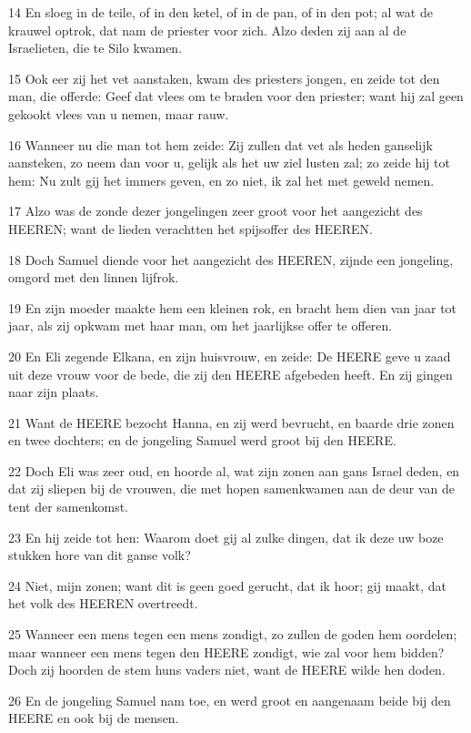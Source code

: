 \par 14 En sloeg in de teile, of in den ketel, of in de pan, of in den pot; al wat de krauwel optrok, dat nam de priester voor zich. Alzo deden zij aan al de Israelieten, die te Silo kwamen.
\par 15 Ook eer zij het vet aanstaken, kwam des priesters jongen, en zeide tot den man, die offerde: Geef dat vlees om te braden voor den priester; want hij zal geen gekookt vlees van u nemen, maar rauw.
\par 16 Wanneer nu die man tot hem zeide: Zij zullen dat vet als heden ganselijk aansteken, zo neem dan voor u, gelijk als het uw ziel lusten zal; zo zeide hij tot hem: Nu zult gij het immers geven, en zo niet, ik zal het met geweld nemen.
\par 17 Alzo was de zonde dezer jongelingen zeer groot voor het aangezicht des HEEREN; want de lieden verachtten het spijsoffer des HEEREN.
\par 18 Doch Samuel diende voor het aangezicht des HEEREN, zijnde een jongeling, omgord met den linnen lijfrok.
\par 19 En zijn moeder maakte hem een kleinen rok, en bracht hem dien van jaar tot jaar, als zij opkwam met haar man, om het jaarlijkse offer te offeren.
\par 20 En Eli zegende Elkana, en zijn huisvrouw, en zeide: De HEERE geve u zaad uit deze vrouw voor de bede, die zij den HEERE afgebeden heeft. En zij gingen naar zijn plaats.
\par 21 Want de HEERE bezocht Hanna, en zij werd bevrucht, en baarde drie zonen en twee dochters; en de jongeling Samuel werd groot bij den HEERE.
\par 22 Doch Eli was zeer oud, en hoorde al, wat zijn zonen aan gans Israel deden, en dat zij sliepen bij de vrouwen, die met hopen samenkwamen aan de deur van de tent der samenkomst.
\par 23 En hij zeide tot hen: Waarom doet gij al zulke dingen, dat ik deze uw boze stukken hore van dit ganse volk?
\par 24 Niet, mijn zonen; want dit is geen goed gerucht, dat ik hoor; gij maakt, dat het volk des HEEREN overtreedt.
\par 25 Wanneer een mens tegen een mens zondigt, zo zullen de goden hem oordelen; maar wanneer een mens tegen den HEERE zondigt, wie zal voor hem bidden? Doch zij hoorden de stem huns vaders niet, want de HEERE wilde hen doden.
\par 26 En de jongeling Samuel nam toe, en werd groot en aangenaam beide bij den HEERE en ook bij de mensen.
